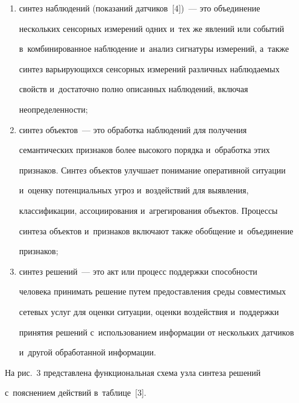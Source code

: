   \begin{enumerate}[(1)]


\item синтез наблюдений (показаний датчиков~[4])~--- это объединение 


нескольких сенсорных измерений одних и~тех же явлений или событий 


в~комбинированное наблюдение и~анализ сигнатуры измерений, а~также 


синтез варь\-и\-ру\-ющих\-ся сенсорных измерений различных наблюдаемых 


свойств и~достаточно пол\-но описанных наблюдений, вклю\-чая 


неопределенности;


\item синтез объектов~--- это обработка наблюдений для получения 


семантических признаков более высокого порядка и~обработка этих 


признаков. Синтез объектов улучшает понимание оперативной ситуации 


и~оценку потенциальных угроз и~воздействий для выявления, 


классификации, ассоциирования и~агрегирования объектов. Процессы 


синтеза объектов и~при\-зна\-ков включают так\-же обобщение и~объединение 


при\-зна\-ков; 


\item синтез решений~--- это акт или процесс поддержки спо\-соб\-ности 


человека принимать решение путем предостав\-ле\-ния среды совместимых 


сетевых услуг для оценки ситуации, оценки воздействия и~поддержки 


принятия решений с~использованием информации от нескольких датчиков 


и~другой обработанной информации.


\end{enumerate}





  На рис.~3 представлена функциональная схема узла синтеза решений 


с~пояснением действий в~таб\-ли\-це~[3].


  






